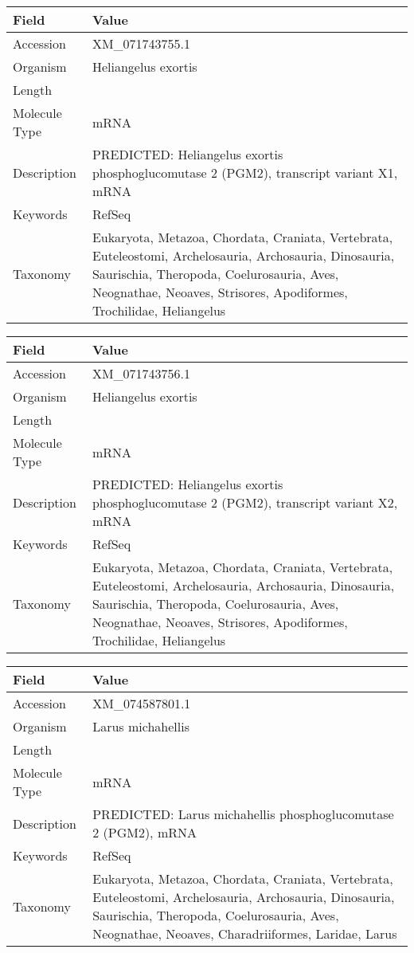 \documentclass[10pt]{article}
\begin{document}
{\footnotesize
\begin{longtable}{>{\raggedright\arraybackslash}p{4.5cm} >{\raggedright\arraybackslash}p{11.5cm}}
\textbf{Field} & \textbf{Value} \\
\hline
Accession & XM\_071743755.1 \\
Organism & Heliangelus exortis \\
Length & 6511 \\
Molecule Type & mRNA \\
Description & PREDICTED: Heliangelus exortis phosphoglucomutase 2 (PGM2), transcript variant X1, mRNA \\
Keywords & RefSeq \\
Taxonomy & Eukaryota, Metazoa, Chordata, Craniata, Vertebrata, Euteleostomi, Archelosauria, Archosauria, Dinosauria, Saurischia, Theropoda, Coelurosauria, Aves, Neognathae, Neoaves, Strisores, Apodiformes, Trochilidae, Heliangelus \\
\end{longtable}
}

{\footnotesize
\begin{longtable}{>{\raggedright\arraybackslash}p{4.5cm} >{\raggedright\arraybackslash}p{11.5cm}}
\textbf{Field} & \textbf{Value} \\
\hline
Accession & XM\_071743756.1 \\
Organism & Heliangelus exortis \\
Length & 6544 \\
Molecule Type & mRNA \\
Description & PREDICTED: Heliangelus exortis phosphoglucomutase 2 (PGM2), transcript variant X2, mRNA \\
Keywords & RefSeq \\
Taxonomy & Eukaryota, Metazoa, Chordata, Craniata, Vertebrata, Euteleostomi, Archelosauria, Archosauria, Dinosauria, Saurischia, Theropoda, Coelurosauria, Aves, Neognathae, Neoaves, Strisores, Apodiformes, Trochilidae, Heliangelus \\
\end{longtable}
}

{\footnotesize
\begin{longtable}{>{\raggedright\arraybackslash}p{4.5cm} >{\raggedright\arraybackslash}p{11.5cm}}
\textbf{Field} & \textbf{Value} \\
\hline
Accession & XM\_074587801.1 \\
Organism & Larus michahellis \\
Length & 2223 \\
Molecule Type & mRNA \\
Description & PREDICTED: Larus michahellis phosphoglucomutase 2 (PGM2), mRNA \\
Keywords & RefSeq \\
Taxonomy & Eukaryota, Metazoa, Chordata, Craniata, Vertebrata, Euteleostomi, Archelosauria, Archosauria, Dinosauria, Saurischia, Theropoda, Coelurosauria, Aves, Neognathae, Neoaves, Charadriiformes, Laridae, Larus \\
\end{longtable}
}
\end{document}
